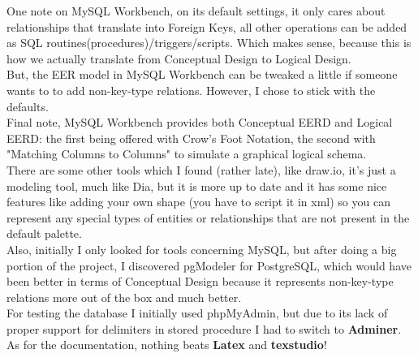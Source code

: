 \documentclass[12pt]{scrartcl}
\begin{document}
One note on MySQL Workbench, on its default settings, it only cares about relationships that translate into Foreign Keys, all other operations can be added as SQL routines(procedures)/triggers/scripts. Which makes sense, because this is how we actually translate from Conceptual Design to Logical Design.\\
But, the EER model in MySQL Workbench can be tweaked a little if someone wants to to add non-key-type relations. However, I chose to stick with the defaults.\\

Final note, MySQL Workbench provides both Conceptual EERD and Logical EERD: the first being offered with Crow's Foot Notation, the second with "Matching Columns to Columns" to simulate a graphical logical schema.\\

There are some other tools which I found (rather late), like draw.io, it's just a modeling tool, much like Dia, but it is more up to date and it has some nice features like adding your own shape (you have to script it in xml) so you can represent any special types of entities or relationships that are not present in the default palette.\\
Also, initially I only looked for tools concerning MySQL, but after doing a big portion of the project, I discovered pgModeler for PostgreSQL, which would have been better in terms of Conceptual Design because it represents non-key-type relations more out of the box and much better.\\

For testing the database I initially used phpMyAdmin, but due to its lack of proper support for delimiters in stored procedure I had to switch to \textbf{Adminer}.\\

As for the documentation, nothing beats \textbf{Latex} and \textbf{texstudio}!

\newpage

\newpage

\newpage

\newpage

\newpage

\newpage

\end{document}
